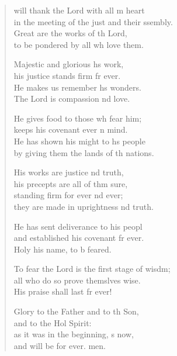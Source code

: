 \settowidth{\versewidth}{To fear the Lord is the first stage of wisdom; +}
\begin{verse}%
  \begin{patverse}
 will thank the Lord with all m heart\Med\\
    in the meeting of the just and their ssembly.\\
Great are the works of th Lord,\Med\\
    to be pondered by all wh love them.

Majestic and glorious h\pointup{\i}s work,\Med\\
    his justice stands firm fr ever.\\
He makes us remember h\pointup{\i}s wonders.\Med\\
    The Lord is compassion nd love.

He gives food to those wh fear him;\Med\\
    keeps his covenant ever \pointup{\i}n mind.\\
He has shown his might to h\pointup{\i}s people\Med\\
    by giving them the lands of th nations.

His works are justice nd truth,\Med\\
    his precepts are all of thm sure,\\
standing firm for ever nd ever;\Med\\
    they are made in uprightness nd truth.

He has sent deliverance to his peopl\Flex\\
    and established his covenant fr ever.\Med\\
    Holy his name, to b feared.

To fear the Lord is the first stage of wisdm;\Flex\\
    all who do so prove themslves wise.\Med\\
His praise shall last fr ever!

Glory to the Father and to th Son,\Med\\
    and to the Hol Spirit:\\
as it was in the beginning, \pointup{\i}s now,\Med\\
    and will be for ever. men.
  \end{patverse}
\end{verse}
